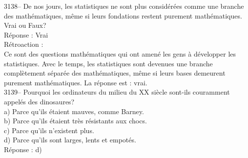 \documentclass[letterpaper, 12pt]{article}
\begin{document}
3138-- De nos jours, les statistiques ne sont plus consid\'er\'ees comme une branche des math\'ematiques, m\^eme si leurs fondations restent purement math\'ematiques.\\
Vrai ou Faux?\\

R\'eponse : Vrai\\

R\'etroaction :\\
Ce sont des questions math\'ematiques qui ont amen\'e les gens \`a d\'evelopper les statistiques. Avec le temps, les statistiques sont devenues une branche compl\`etement s\'epar\'ee des math\'ematiques, m\^eme si leurs bases demeurent purement math\'ematiques. La r\'eponse est : vrai.\\



3139-- Pourquoi les ordinateurs du milieu du {\scriptsize XX\ieme{}} si\`ecle sont-ils couramment appel\'es des dinosaures?\\

a) Parce qu'ils \'etaient mauves, comme Barney.\\
b) Parce qu'ils \'etaient tr\`es r\'esistants aux chocs.\\
c) Parce qu'ils n'existent plus.\\
d) Parce qu'ils sont larges, lents et empot\'es.\\

R\'eponse : d)\\
\end{document}

